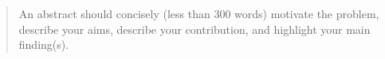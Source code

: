 \begin{abstract}

An abstract should concisely (less than 300 words) motivate the problem, describe your aims, describe your contribution, and highlight your main finding(s). 

\end{abstract}